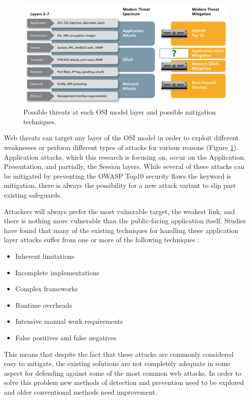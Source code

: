 \begin{figure}
	\includegraphics[width=450px]{./assets/img/osithreats.png}
	\caption{Possible threats at each OSI model layer and possible mitigation techniques. {\cite{f5whitepaper}} }
	\label{fig:osithreats}
\end{figure}

Web threats can target any layer of the OSI model in order to exploit different weaknesses or perform different types of attacks for various reasons (Figure \ref{fig:osithreats}).  Application attacks, which this research is focusing on, occur on the Application, Presentation, and partially, the Session layers.  While several of these attacks can be mitigated by preventing the OWASP Top10 security flaws the keyword is mitigation, there is always the possibility for a new attack variant to slip past existing safeguards.

Attackers will always prefer the most vulnerable target, the weakest link, and there is nothing more vulnerable than the public-facing application itself.  Studies have found that many of the existing techniques for handling these application layer attacks suffer from one or more of the following techniques \cite{aSurveyOnWeb}:

\begin{itemize}
	\item Inherent limitations
	\item Incomplete implementations
	\item Complex frameworks
	\item Runtime overheads
	\item Intensive manual work requirements
	\item False positives and false negatives
\end{itemize}

This means that despite the fact that these attacks are commonly considered easy to mitigate, the existing solutions are not completely adequate in some aspect for defending against some of the most common web attacks.  In order to solve this problem new methods of detection and prevention need to be explored and older conventional methods need improvement.

